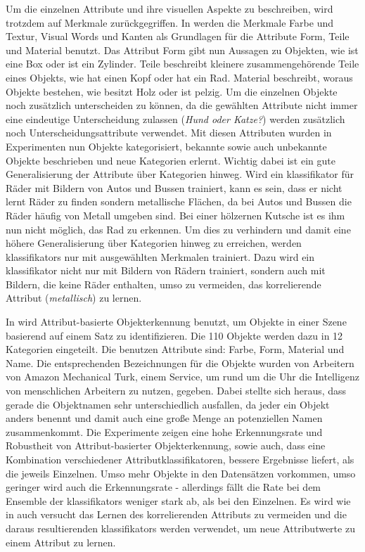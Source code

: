 Um die einzelnen Attribute und ihre visuellen Aspekte zu beschreiben, wird trotzdem auf Merkmale zurückgegriffen. In \cite{descObjbyAtr} werden die Merkmale Farbe und Textur, Visual Words und Kanten als Grundlagen für die Attribute Form, Teile und Material benutzt. Das Attribut Form gibt nun Aussagen zu Objekten, wie \glqq ist eine Box\grqq \xspace oder \glqq ist ein Zylinder\grqq. Teile beschreibt kleinere zusammengehörende Teile eines Objekts, wie \glqq hat einen Kopf\grqq \xspace oder \glqq hat ein Rad\grqq. Material beschreibt, woraus Objekte bestehen, wie \glqq besitzt Holz\grqq \xspace oder \glqq ist pelzig\grqq. Um die einzelnen Objekte noch zusätzlich unterscheiden zu können, da die gewählten Attribute nicht immer eine eindeutige Unterscheidung zulassen (\textit{Hund oder Katze?}) werden zusätzlich noch Unterscheidungsattribute verwendet. Mit diesen Attributen wurden in Experimenten nun Objekte kategorisiert, bekannte sowie auch unbekannte Objekte beschrieben und neue Kategorien erlernt. Wichtig dabei ist ein gute Generalisierung der Attribute über Kategorien hinweg. Wird ein \gls{klassifikator} für Räder mit Bildern von Autos und Bussen trainiert, kann es sein, dass er nicht lernt Räder zu finden sondern metallische Flächen, da bei Autos und Bussen die Räder häufig von Metall umgeben sind. Bei einer hölzernen Kutsche ist es ihm nun nicht möglich, das Rad zu erkennen. Um dies zu verhindern und damit eine höhere Generalisierung über Kategorien hinweg zu erreichen, werden \glspl{klassifikator} nur mit ausgewählten Merkmalen trainiert. Dazu wird ein \gls{klassifikator} nicht nur mit Bildern von Rädern trainiert, sondern auch mit Bildern, die keine Räder enthalten, umso zu vermeiden, das korrelierende Attribut (\textit{metallisch}) zu lernen.   \par    

In \cite{atrBasedObjIden} wird Attribut-basierte Objekterkennung benutzt, um Objekte in einer Szene basierend auf einem Satz zu identifizieren. Die 110 Objekte werden dazu in 12 Kategorien eingeteilt. Die benutzen Attribute sind: Farbe, Form, Material und Name. Die entsprechenden Bezeichnungen für die Objekte wurden von Arbeitern von Amazon Mechanical Turk, einem Service, um rund um die Uhr die Intelligenz von menschlichen Arbeitern zu nutzen, gegeben. Dabei stellte sich heraus, dass gerade die Objektnamen sehr unterschiedlich ausfallen, da jeder ein Objekt anders benennt und damit auch eine große Menge an potenziellen Namen zusammenkommt. Die Experimente zeigen eine hohe Erkennungsrate und Robustheit von Attribut-basierter Objekterkennung, sowie auch, dass eine Kombination verschiedener Attributklassifikatoren, bessere Ergebnisse liefert, als die jeweils Einzelnen. Umso mehr Objekte in den Datensätzen vorkommen, umso geringer wird auch die Erkennungsrate - allerdings fällt die Rate bei dem Ensemble der \glspl{klassifikator} weniger stark ab, als bei den Einzelnen. Es wird wie in \cite{descObjbyAtr} auch versucht das Lernen des korrelierenden Attributs zu vermeiden und die daraus resultierenden \glspl{klassifikator} werden verwendet, um neue Attributwerte zu einem Attribut zu lernen.

